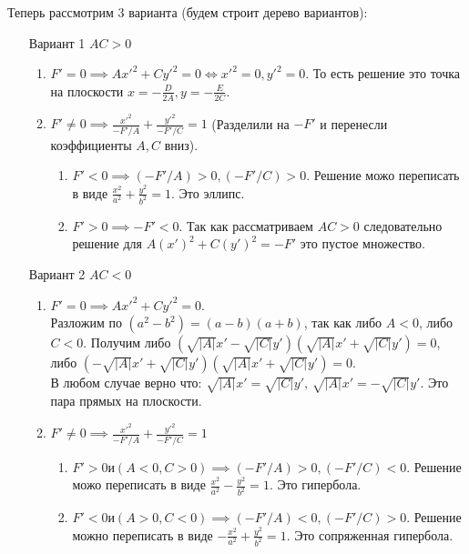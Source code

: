 \documentclass[a4paper,12pt,twoside]{article}
\begin{document}
Теперь рассмотрим 3 варианта (будем строит дерево вариантов):
\begin{enumerate}
\item[Вариант 1] $AC > 0$
\begin{enumerate}
\item  $ F' = 0 \implies Ax'^2 + Cy'^2 = 0 \iff x'^2 = 0, y'^2 = 0$. То есть решение это точка на 
плоскости $x = - \frac{D}{2A}, y = - \frac{E}{2C}$.

\item $ F' \neq 0 \implies \frac{x'^2}{-F' / A} +  \frac{y'^2}{-F' / C} = 1$ (Разделили на $ - F'$ и перенесли коэффициенты $A, C$ вниз). 
\begin{enumerate}
\item $ F' < 0 \implies  (-F' / A) > 0 , (-F' / C)  > 0 $. 
Решение можо переписать в виде $ \frac{x^2}{a^2} + \frac{y^2}{b^2} = 1 $. Это эллипс.
\item $ F' > 0 \implies -F' < 0 $. Так как рассматриваем 
$ AC > 0 $ следовательно решение для $ A(x')^2 + C(y')^2 = - F' $ это пустое множество. 
\end{enumerate}

\end{enumerate}

\bigskip
\item[Вариант 2] $AC < 0$
\begin{enumerate}
\item  $ F' = 0 \implies Ax'^2 + Cy'^2 = 0 $.  \\
Разложим по $ ( a^2 - b^2 ) = (a - b)(a + b) $, так как либо $A < 0$,  либо $ C < 0 $.
Получим либо $ (\sqrt{|A|}x' - \sqrt{|C|}y')(\sqrt{|A|}x' + \sqrt{|C|}y') = 0 $, \\
либо $ (- \sqrt{|A|}x' + \sqrt{|C|}y')(\sqrt{|A|}x' + \sqrt{|C|}y') = 0 $. \\
В любом случае верно что:
$ \sqrt{|A|}x' = \sqrt{|C|}y', \, \sqrt{|A|}x' = - \sqrt{|C|}y' $.
 Это пара прямых на плоскости.

\item $ F' \neq 0 \implies \frac{x'^2}{-F' / A} +  \frac{y'^2}{-F' / C} = 1$ 
\begin{enumerate}
\item $  F' > 0 и (A < 0, C > 0) \implies  (-F' / A) > 0,  (-F' / C)  < 0 $. 
Решение можо переписать в виде $ \frac{x^2}{a^2} - \frac{y^2}{b^2} = 1 $. 
Это гипербола.
\item $ F' < 0 и (A > 0, C < 0) \implies   (-F' / A) < 0,  (-F' / C)  > 0 $. 
Решение можно переписать в виде $ - \frac{x^2}{a^2} + \frac{y^2}{b^2} = 1 $. 
Это сопряженная гипербола.
\end{enumerate}


\end{enumerate}
\end{enumerate}
\end{document}
